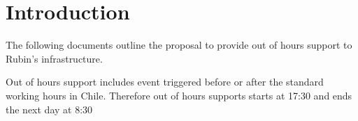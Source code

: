 \section{Introduction}

The following documents outline the proposal to provide out of hours support to Rubin's infrastructure.

Out of hours support includes event triggered before or after the standard working hours in Chile. Therefore out of hours supports starts at 17:30 and ends the next day at 8:30